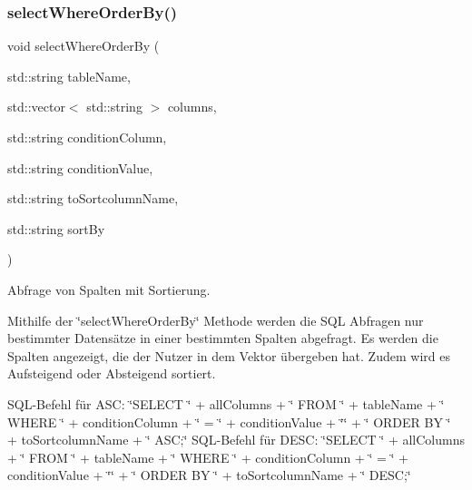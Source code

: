 \subsubsection{select\+Where\+Order\+By()}
{\footnotesize\ttfamily void select\+Where\+Order\+By (\begin{DoxyParamCaption}\item[{std\+::string}]{table\+Name,  }\item[{std\+::vector$<$ std\+::string $>$}]{columns,  }\item[{std\+::string}]{condition\+Column,  }\item[{std\+::string}]{condition\+Value,  }\item[{std\+::string}]{to\+Sortcolumn\+Name,  }\item[{std\+::string}]{sort\+By }\end{DoxyParamCaption})}



Abfrage von Spalten mit Sortierung. 

Mithilfe der \char`\"{}select\+Where\+Order\+By\char`\"{} Methode werden die S\+QL Abfragen nur bestimmter Datensätze in einer bestimmten Spalten abgefragt. Es werden die Spalten angezeigt, die der Nutzer in dem Vektor übergeben hat. Zudem wird es Aufsteigend oder Absteigend sortiert.

S\+Q\+L-\/\+Befehl für A\+SC\+: \char`\"{}\+S\+E\+L\+E\+C\+T \char`\"{} + all\+Columns + \char`\"{} F\+R\+O\+M \char`\"{} + table\+Name + \char`\"{} W\+H\+E\+R\+E \char`\"{} + condition\+Column + \char`\"{} = \textquotesingle{}\char`\"{} + condition\+Value + \char`\"{}\textquotesingle{}\char`\"{} + \char`\"{} O\+R\+D\+E\+R B\+Y \char`\"{} + to\+Sortcolumn\+Name + \char`\"{} A\+S\+C;\char`\"{} S\+Q\+L-\/\+Befehl für D\+E\+SC\+: \char`\"{}\+S\+E\+L\+E\+C\+T \char`\"{} + all\+Columns + \char`\"{} F\+R\+O\+M \char`\"{} + table\+Name + \char`\"{} W\+H\+E\+R\+E \char`\"{} + condition\+Column + \char`\"{} = \textquotesingle{}\char`\"{} + condition\+Value + \char`\"{}\textquotesingle{}\char`\"{} + \char`\"{} O\+R\+D\+E\+R B\+Y \char`\"{} + to\+Sortcolumn\+Name + \char`\"{} D\+E\+S\+C;\char`\"{}


